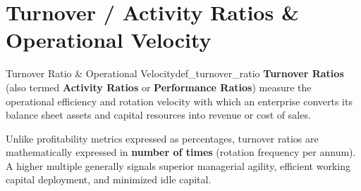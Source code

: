 \section{Turnover / Activity Ratios \& Operational Velocity}

\begin{definition}{Turnover Ratio \& Operational Velocity}{def_turnover_ratio}
\textbf{Turnover Ratios} (also termed \textbf{Activity Ratios} or \textbf{Performance Ratios}) measure the operational efficiency and rotation velocity with which an enterprise converts its balance sheet assets and capital resources into revenue or cost of sales.

Unlike profitability metrics expressed as percentages, turnover ratios are mathematically expressed in \textbf{number of times} (rotation frequency per annum). A higher multiple generally signals superior managerial agility, efficient working capital deployment, and minimized idle capital.
\end{definition}

